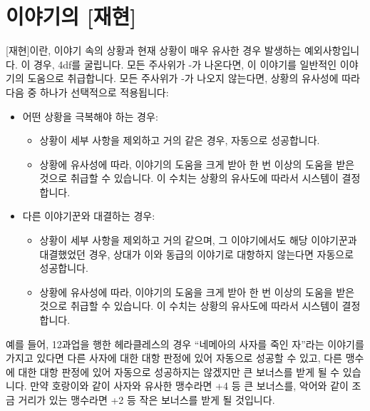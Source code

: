 \documentclass[12pt]{report}
\begin{document}
	\section*{이야기의 [재현]}
	[재현]이란, 이야기 속의 상황과 현재 상황이 매우 유사한 경우 발생하는 예외사항입니다. 이 경우, 4df를 굴립니다. 모든 주사위가 -가 나온다면, 이 이야기를 일반적인 이야기의 도움으로 취급합니다. 모든 주사위가 -가 나오지 않는다면, 상황의 유사성에 따라 다음 중 하나가 선택적으로 적용됩니다:
	\begin{itemize}
		\item 어떤 상황을 극복해야 하는 경우:
		
			\begin{itemize}
				\item 상황이 세부 사항을 제외하고 거의 같은 경우, 자동으로 성공합니다.
				\item 상황에 유사성에 따라, 이야기의 도움을 크게 받아 한 번 이상의 도움을 받은 것으로 취급할 수 있습니다. 이 수치는 상황의 유사도에 따라서 시스템이 결정합니다.
			\end{itemize}
	
		\item 다른 이야기꾼와 대결하는 경우:
	
			\begin{itemize}
				\item 상황이 세부 사항을 제외하고 거의 같으며, 그 이야기에서도 해당 이야기꾼과 대결했었던 경우, 상대가 이와 동급의 이야기로 대항하지 않는다면 자동으로 성공합니다.
				\item 상황에 유사성에 따라, 이야기의 도움을 크게 받아 한 번 이상의 도움을 받은 것으로 취급할 수 있습니다. 이 수치는 상황의 유사도에 따라서 시스템이 결정합니다.
			\end{itemize}
	\end{itemize}
	예를 들어, 12과업을 행한 헤라클레스의 경우 “네메아의 사자를 죽인 자”라는 이야기를 가지고 있다면 다른 사자에 대한 대항 판정에 있어 자동으로 성공할 수 있고, 다른 맹수에 대한 대항 판정에 있어 자동으로 성공하지는 않겠지만 큰 보너스를 받게 될 수 있습니다. 만약 호랑이와 같이 사자와 유사한 맹수라면 +4 등 큰 보너스를, 악어와 같이 조금 거리가 있는 맹수라면 +2 등 작은 보너스를 받게 될 것입니다.
	
	
\end{document}
